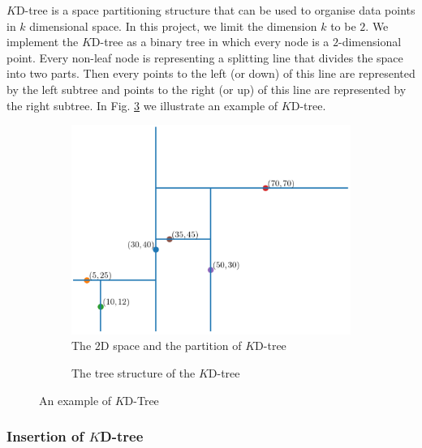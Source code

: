 $K$D-tree is a space partitioning structure that can be used to organise data points in $k$ dimensional space. In this project, we limit the dimension $k$ to be $2$. We implement the $K$D-tree as a binary tree in which every node is a $2$-dimensional point. Every non-leaf node is representing a splitting line that divides the space into two parts. Then every points to the left (or down) of this line are represented by the left subtree and points to the right (or up) of this line are represented by the right subtree. In Fig. \ref{fig:kd_tree_example} we illustrate an example of $K$D-tree.

\begin{figure}
     \centering
     \begin{subfigure}[b]{0.60\textwidth}
         \centering
         \includegraphics[width=\textwidth]{graphs/implementation/2d/kdtree_partition}
         \caption{The $2$D space and the partition of $K$D-tree}
         \label{fig:y equals x}
     \end{subfigure}
     \hfill
     \begin{subfigure}[b]{0.35\textwidth}
         \centering
         
         \caption{The tree structure of the $K$D-tree}
         \label{fig:three sin x}
     \end{subfigure}
        \caption{An example of $K$D-Tree}
        \label{fig:kd_tree_example}
\end{figure}

\subsubsection{Insertion of $K$D-tree}

